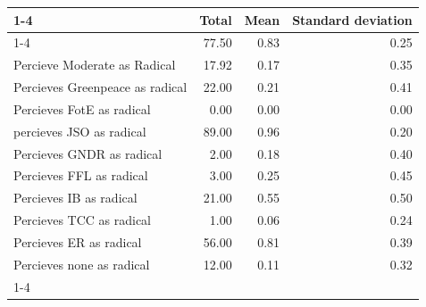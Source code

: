 \documentclass{article}
\begin{document}
\begin{table}[!h]
\centering
\begin{tabular}{llll}
\cline{1-4}
\multicolumn{1}{c}{} &
  \multicolumn{1}{|r}{Total} &
  \multicolumn{1}{r}{Mean} &
  \multicolumn{1}{r}{Standard deviation} \\
\cline{1-4}
\multicolumn{1}{l}{Percieve Radical as Radical} &
  \multicolumn{1}{|r}{77.50} &
  \multicolumn{1}{r}{0.83} &
  \multicolumn{1}{r}{0.25} \\
\multicolumn{1}{l}{Percieve Moderate as Radical} &
  \multicolumn{1}{|r}{17.92} &
  \multicolumn{1}{r}{0.17} &
  \multicolumn{1}{r}{0.35} \\
\multicolumn{1}{l}{Percieves Greenpeace as radical} &
  \multicolumn{1}{|r}{22.00} &
  \multicolumn{1}{r}{0.21} &
  \multicolumn{1}{r}{0.41} \\
\multicolumn{1}{l}{Percieves FotE as radical} &
  \multicolumn{1}{|r}{0.00} &
  \multicolumn{1}{r}{0.00} &
  \multicolumn{1}{r}{0.00} \\
\multicolumn{1}{l}{percieves JSO as radical} &
  \multicolumn{1}{|r}{89.00} &
  \multicolumn{1}{r}{0.96} &
  \multicolumn{1}{r}{0.20} \\
\multicolumn{1}{l}{Percieves GNDR as radical} &
  \multicolumn{1}{|r}{2.00} &
  \multicolumn{1}{r}{0.18} &
  \multicolumn{1}{r}{0.40} \\
\multicolumn{1}{l}{Percieves FFL as radical} &
  \multicolumn{1}{|r}{3.00} &
  \multicolumn{1}{r}{0.25} &
  \multicolumn{1}{r}{0.45} \\
\multicolumn{1}{l}{Percieves IB as radical} &
  \multicolumn{1}{|r}{21.00} &
  \multicolumn{1}{r}{0.55} &
  \multicolumn{1}{r}{0.50} \\
\multicolumn{1}{l}{Percieves TCC as radical} &
  \multicolumn{1}{|r}{1.00} &
  \multicolumn{1}{r}{0.06} &
  \multicolumn{1}{r}{0.24} \\
\multicolumn{1}{l}{Percieves ER as radical} &
  \multicolumn{1}{|r}{56.00} &
  \multicolumn{1}{r}{0.81} &
  \multicolumn{1}{r}{0.39} \\
\multicolumn{1}{l}{Percieves none as radical} &
  \multicolumn{1}{|r}{12.00} &
  \multicolumn{1}{r}{0.11} &
  \multicolumn{1}{r}{0.32} \\
\cline{1-4}
\end{tabular}
\end{table}
\end{document}
